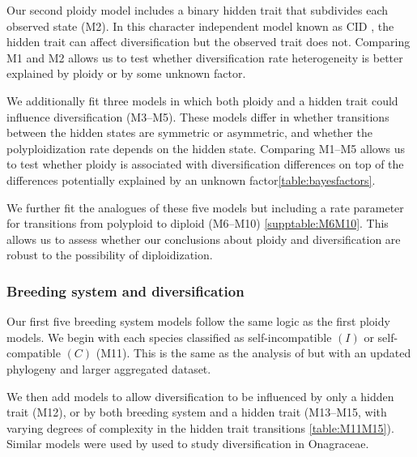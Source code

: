Our second ploidy model includes a binary hidden trait that subdivides each observed state (M2).
In this character independent model known as CID \citep{beaulieu_2016}, the hidden trait can affect diversification but the observed trait does not.
Comparing M1 and M2 allows us to test whether diversification rate heterogeneity is better explained by ploidy or by some unknown factor.

We additionally fit three models in which both ploidy and a hidden trait could influence diversification (M3--M5).
These models differ in whether transitions between the hidden states are symmetric or asymmetric, and whether the polyploidization rate depends on the hidden state.
Comparing M1--M5 allows us to test whether ploidy is associated with diversification differences on top of the differences potentially explained by an unknown factor\cref{table:bayesfactors}.

We further fit the analogues of these five models but including a rate parameter for transitions from polyploid to diploid (M6--M10) \cref{supptable:M6M10}.
This allows us to assess whether our conclusions about ploidy and diversification are robust to the possibility of diploidization.

\subsubsection{Breeding system and diversification}

Our first five breeding system models follow the same logic as the first ploidy models.
We begin with each species classified as self-incompatible $(I)$ or self-compatible $(C)$ (M11).
This is the same as the analysis of \citet{goldberg_2010} but with an updated phylogeny \citep{sarkinen_2013} and larger aggregated dataset.

We then add models to allow diversification to be influenced by only a hidden trait (M12), or by both breeding system and a hidden trait (M13--M15, with varying degrees of complexity in the hidden trait transitions \cref{table:M11M15}).
Similar models were used by \citet{freyman_2017} used to study diversification in Onagraceae.

